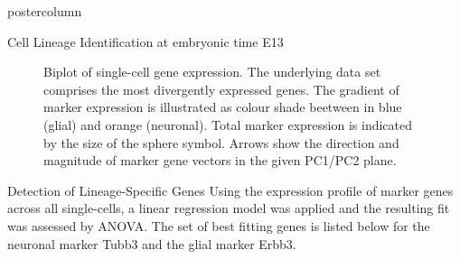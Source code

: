 \documentclass{beamer}
\begin{document}
\begin{frame}
\begin{columns}
\begin{column}{.45\textwidth}
\begin{beamercolorbox}[center]{postercolumn}
\begin{minipage}{.98\textwidth}
{\begin{myblock}{Cell Lineage Identification at embryonic time E13}
\begin{figure}
\begin{minipage}{0.9\textwidth}
	\caption{Biplot of single-cell gene expression. The underlying data set
		comprises the most divergently expressed genes. The gradient of marker
		expression is illustrated as colour shade beetween in blue (glial) and
		orange (neuronal).
		Total marker expression is indicated by the size of the sphere symbol.
		Arrows show the direction and magnitude of marker gene vectors
		in the given PC1/PC2 plane.}
	\label{fig:biplot}
\end{minipage}
\end{figure}
\end{myblock}\vfill
\begin{myblock}{Detection of Lineage-Specific Genes}
Using the expression profile of marker genes across all single-cells,
a linear regression model was applied and the resulting fit was assessed
by ANOVA. The set of best fitting genes is listed below for the neuronal
marker Tubb3 and the glial marker Erbb3.
\begin{figure}
\begin{minipage}{0.7\textwidth}

\end{minipage}
\end{figure}
\end{myblock}}
\end{minipage}
\end{beamercolorbox}
\end{column}
\end{columns}
\end{frame}
\end{document}
